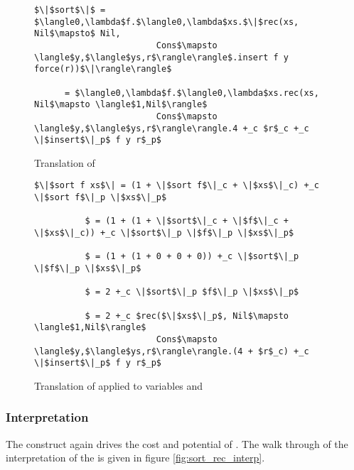 \begin{figure}[H]
\caption{Translation of }
\label{fig:sort}
\begin{lstlisting}
$\|$sort$\|$ = $\langle0,\lambda$f.$\langle0,\lambda$xs.$\|$rec(xs, Nil$\mapsto$ Nil,
                        Cons$\mapsto \langle$y,$\langle$ys,r$\rangle\rangle$.insert f y force(r))$\|\rangle\rangle$

      = $\langle0,\lambda$f.$\langle0,\lambda$xs.rec(xs, Nil$\mapsto \langle$1,Nil$\rangle$
                        Cons$\mapsto \langle$y,$\langle$ys,r$\rangle\rangle.4 +_c $r$_c +_c \|$insert$\|_p$ f y r$_p$
\end{lstlisting}
\end{figure}

\begin{figure}[H]
  \caption{Translation of  applied to variables  and }
\label{fig:sort_applied}
\begin{lstlisting}
$\|$sort f xs$\| = (1 + \|$sort f$\|_c + \|$xs$\|_c) +_c \|$sort f$\|_p \|$xs$\|_p$

          $ = (1 + (1 + \|$sort$\|_c + \|$f$\|_c + \|$xs$\|_c)) +_c \|$sort$\|_p \|$f$\|_p \|$xs$\|_p$

          $ = (1 + (1 + 0 + 0 + 0)) +_c \|$sort$\|_p \|$f$\|_p \|$xs$\|_p$

          $ = 2 +_c \|$sort$\|_p $f$\|_p \|$xs$\|_p$

          $ = 2 +_c $rec($\|$xs$\|_p$, Nil$\mapsto \langle$1,Nil$\rangle$
                        Cons$\mapsto \langle$y,$\langle$ys,r$\rangle\rangle.(4 + $r$_c) +_c \|$insert$\|_p$ f y r$_p$
\end{lstlisting}
\end{figure}


\subsubsection{Interpretation}
The  construct again drives the cost and potential of .
The walk through of the interpretation of the  is given in figure \ref{fig:sort_rec_interp}.

